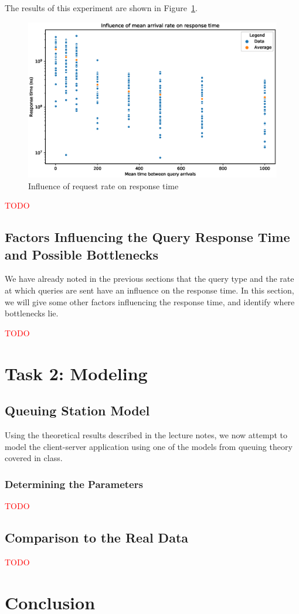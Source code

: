 \documentclass[journal]{IEEEtran}
\theoremstyle{definition}
\begin{document}
The results of this experiment are shown in Figure~\ref{fig:rate_influence}.
\begin{figure}[!hbtp]
	\centering
	\includegraphics[width=\columnwidth]{../plotting/rate_influence}
	\caption{Influence of request rate on response time}
	\label{fig:rate_influence}
\end{figure}

\textcolor{red}{TODO}

\subsection{Factors Influencing the Query Response Time and Possible Bottlenecks}
We have already noted in the previous sections that the query type and the rate at which queries are sent have an influence on the response time.
In this section, we will give some other factors influencing the response time, and identify where bottlenecks lie.

\textcolor{red}{TODO}

\section{Task 2: Modeling}
\label{sec:task2}
\subsection{Queuing Station Model}
Using the theoretical results described in the lecture notes, we now attempt to model the client-server application using one of the models from queuing theory covered in class.

\subsubsection{Determining the Parameters}
\textcolor{red}{TODO}

\subsection{Comparison to the Real Data}
\textcolor{red}{TODO}

\section*{Conclusion}
 
\end{document}
